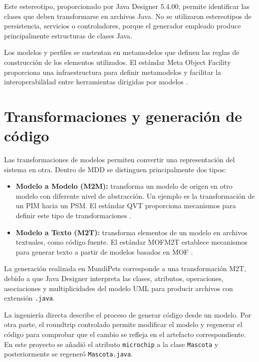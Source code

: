 \documentclass[10pt,a4paper,openany]{report}
\begin{document}
	Este estereotipo, proporcionado por Java Designer 5.4.00, permite
	identificar las clases que deben transformarse en archivos Java. No se
	utilizaron estereotipos de persistencia, servicios o controladores,
	porque el generador empleado produce principalmente estructuras de
	clases Java.
	
	Los modelos y perfiles se sustentan en metamodelos que definen las reglas
	de construcción de los elementos utilizados. El estándar Meta Object
	Facility proporciona una infraestructura para definir metamodelos y
	facilitar la interoperabilidad entre herramientas dirigidas por modelos
	\cite{omgmof2016}.
	
	\section{Transformaciones y generación de código}
	
	Las transformaciones de modelos permiten convertir una representación
	del sistema en otra. Dentro de MDD se distinguen principalmente dos
	tipos:
	
	\begin{itemize}
		
		\item \textbf{Modelo a Modelo (M2M):} transforma un modelo de origen
		en otro modelo con diferente nivel de abstracción. Un ejemplo es la
		transformación de un PIM hacia un PSM. El estándar QVT proporciona
		mecanismos para definir este tipo de transformaciones
		\cite{omgqvt2016}.
		
		\item \textbf{Modelo a Texto (M2T):} transforma elementos de un
		modelo en archivos textuales, como código fuente. El estándar MOFM2T
		establece mecanismos para generar texto a partir de modelos basados
		en MOF \cite{omgmof2008}.
		
	\end{itemize}
	
	La generación realizada en MundiPets corresponde a una transformación
	M2T, debido a que Java Designer interpreta las clases, atributos,
	operaciones, asociaciones y multiplicidades del modelo UML para producir
	archivos con extensión \texttt{.java}.
	
	La ingeniería directa describe el proceso de generar código desde un
	modelo. Por otra parte, el roundtrip controlado permite modificar el
	modelo y regenerar el código para comprobar que el cambio se refleja en
	el artefacto correspondiente. En este proyecto se añadió el atributo
	\texttt{microchip} a la clase \texttt{Mascota} y posteriormente se
	regeneró \texttt{Mascota.java}.
	
\end{document}
